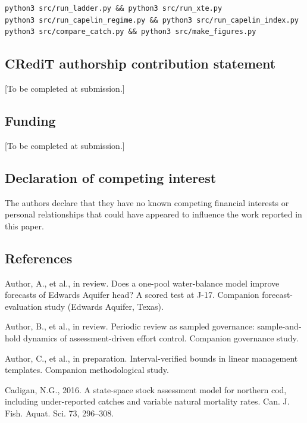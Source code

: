 \documentclass[11pt]{article}
\begin{document}
\begin{verbatim}
python3 src/run_ladder.py && python3 src/run_xte.py
python3 src/run_capelin_regime.py && python3 src/run_capelin_index.py
python3 src/compare_catch.py && python3 src/make_figures.py
\end{verbatim}

\subsection{CRediT authorship contribution
statement}\label{credit-authorship-contribution-statement}

{[}To be completed at submission.{]}

\subsection{Funding}\label{funding}

{[}To be completed at submission.{]}

\subsection{Declaration of competing
interest}\label{declaration-of-competing-interest}

The authors declare that they have no known competing financial
interests or personal relationships that could have appeared to
influence the work reported in this paper.

\subsection{References}\label{references}

Author, A., et al., in review. Does a one-pool water-balance model
improve forecasts of Edwards Aquifer head? A scored test at J-17.
Companion forecast-evaluation study (Edwards Aquifer, Texas).

Author, B., et al., in review. Periodic review as sampled governance:
sample-and-hold dynamics of assessment-driven effort control. Companion
governance study.

Author, C., et al., in preparation. Interval-verified bounds in linear
management templates. Companion methodological study.

Cadigan, N.G., 2016. A state-space stock assessment model for northern
cod, including under-reported catches and variable natural mortality
rates. Can. J. Fish. Aquat. Sci. 73, 296--308.
\end{document}
